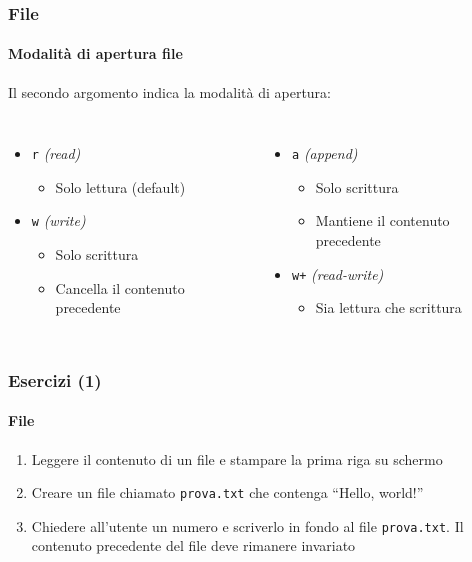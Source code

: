 \begin{contentframe}
    \frametitle{File}
    \framesubtitle{Modalità di apertura file}

    Il secondo argomento indica la modalità di apertura:
    
    \begin{columns}
        \begin{itemize}
            \item \texttt{r} \textit{(read)}
            \begin{itemize}
                \item Solo lettura (default)
            \end{itemize}
            \item \texttt{w} \textit{(write)}
            \begin{itemize}
                \item Solo scrittura
                \item Cancella il contenuto precedente
            \end{itemize}
        \end{itemize}
    
        \begin{itemize}
            \item \texttt{a} \textit{(append)}
            \begin{itemize}
                \item Solo scrittura
                \item Mantiene il contenuto precedente
            \end{itemize}
            \item \texttt{w+} \textit{(read-write)}
            \begin{itemize}
                \item Sia lettura che scrittura
            \end{itemize}
        \end{itemize}
    \end{columns}
\end{contentframe}

\begin{exerciseframe}
    \frametitle{Esercizi (1)}
    \framesubtitle{File}

    \begin{enumerate}
        \item Leggere il contenuto di un file e stampare la prima riga su schermo
        \bigskip
        \item Creare un file chiamato \texttt{prova.txt} che contenga ``Hello, world!''
        \bigskip
        \item Chiedere all'utente un numero e scriverlo in fondo al file \texttt{prova.txt}. Il contenuto precedente del file deve rimanere invariato
    \end{enumerate}
\end{exerciseframe}

